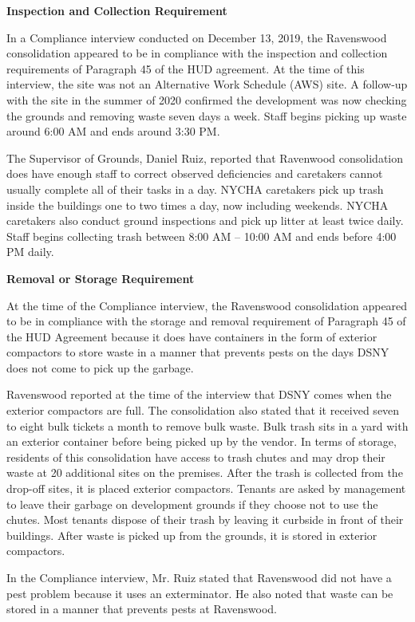 

\textbf{Inspection and Collection Requirement}

In a Compliance interview conducted on December 13, 2019, the Ravenswood consolidation appeared to be in compliance with the inspection and collection requirements of Paragraph 45 of the HUD agreement. At the time of this interview, the site was not an Alternative Work Schedule (AWS) site. A follow-up with the site in the summer of 2020 confirmed the development was now checking the grounds and removing waste seven days a week. Staff begins picking up waste around 6:00 AM and ends around 3:30 PM.

The Supervisor of Grounds, Daniel Ruiz, reported that Ravenwood consolidation does have enough staff to correct observed deficiencies and caretakers cannot usually complete all of their tasks in a day. NYCHA caretakers pick up trash inside the buildings one to two times a day, now including weekends. NYCHA caretakers also conduct ground inspections and pick up litter at least twice daily. Staff begins collecting trash between 8:00 AM -- 10:00 AM and ends before 4:00 PM daily.

\textbf{Removal or Storage Requirement}

At the time of the Compliance interview, the Ravenswood consolidation appeared to be in compliance with the storage and removal requirement of Paragraph 45 of the HUD Agreement because it does have containers in the form of exterior compactors to store waste in a manner that prevents pests on the days DSNY does not come to pick up the garbage. 

Ravenswood reported at the time of the interview that DSNY comes when the exterior compactors are full. The consolidation also stated that it received seven to eight bulk tickets a month to remove bulk waste. Bulk trash sits in a yard with an exterior container before being picked up by the vendor. In terms of storage, residents of this consolidation have access to trash chutes and may drop their waste at 20 additional sites on the premises. After the trash is collected from the drop-off sites, it is placed exterior compactors. Tenants are asked by management to leave their garbage on development grounds if they choose not to use the chutes. Most tenants dispose of their trash by leaving it curbside in front of their buildings. After waste is picked up from the grounds, it is stored in exterior compactors. 

In the Compliance interview, Mr. Ruiz stated that Ravenswood did not have a pest problem because it uses an exterminator. He also noted that waste can be stored in a manner that prevents pests at Ravenswood.

